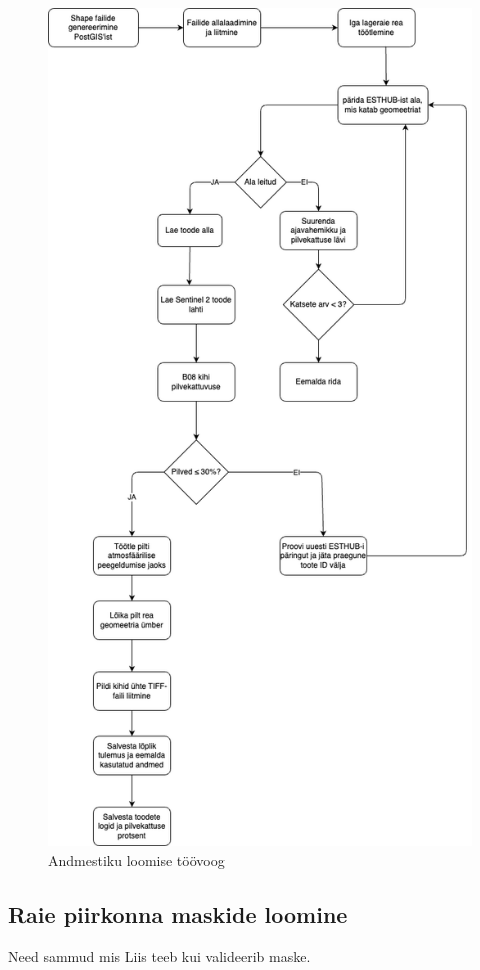 \begin{figure}[H]
    \centering
    \includegraphics[width=.6\textwidth]{figures/andmestik/andmete_voog.drawio.png}
    \caption{Andmestiku loomise töövoog}
    \label{fig:terveflow}
\end{figure}

\subsection{Raie piirkonna maskide loomine}
Need sammud mis Liis teeb kui valideerib maske.